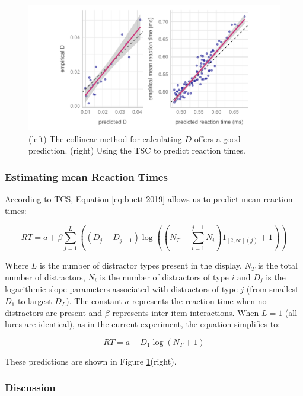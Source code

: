 \documentclass[smallextended]{svjour3}       %
\begin{document}
\begin{figure}
\centering
\includegraphics[width=\textwidth]{../plots/computational_replication.pdf}
\caption{(left) The collinear method for calculating $D$ offers a good prediction. (right) Using the TSC to predict reaction times.}
\label{fig:comp_rep}
\end{figure}

\subsubsection{Estimating mean Reaction Times}

According to TCS, Equation \ref{eq:buetti2019} allows us to predict mean reaction times:

\begin{equation}
RT = a + \beta\sum_{j=1}^L\left((D_j - D_{j-1})\log\left(\left(N_T - \sum_{i=1}^{j-1}N_i\right)1_{[2,\infty](j)}+1 \right)\right)
\label{eq:buetti2019}
\end{equation}

Where $L$ is the number of distractor types present in the display, $N_T$ is the total number of distractors, $N_i$ is the number of distractors of type $i$ and $D_j$ is the logarithmic slope parameters associated with distractors of type $j$ (from smallest $D_1$ to largest $D_L$). The constant $a$ represents the reaction time when no distractors are present and $\beta$ represents inter-item interactions. When $L=1$ (all lures are identical), as in the current experiment, the equation simplifies to:

\begin{equation}
RT = a + D_1\log(N_T+1)
\end{equation}

These predictions are shown in Figure \ref{fig:comp_rep}(right).

\subsubsection{Discussion}
\end{document}
